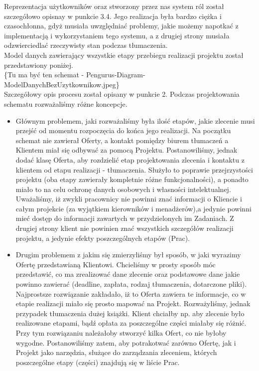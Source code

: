 \documentclass[licencjacka]{pracamgr}
\begin{document}
Reprezentacja użytkowników oraz stworzony przez nas system ról został szczegółowo opisnay w punkcie 3.4. 
Jego realizacja była bardzo ciężka i czasochłonna, gdyż musiała uwzględniać problemy, jakie możemy napotkać z implementacją i wykorzystaniem tego systemu, 
a z drugiej strony musiała odzwierciedlać rzeczywisty stan podczas tłumaczenia.\\

Model danych zawierający wszystkie etapy przebiegu realizacji projektu został przedstawiony poniżej.\\
\{Tu ma być ten schemat - Pengurus-Diagram-ModelDanychBezUzytkownikow.jpeg\} \\
Szczegółowy opis procesu został opisany w punkcie 2. Podczas projektowania schematu rozważaliśmy różne koncepcje.
\begin{itemize}
\item Głównym problemem, jaki rozważaliśmy była ilość etapów, jakie zlecenie musi przejść od momentu rozpoczęcia do końca jego realizacji. 
Na początku schemat nie zawierał Oferty, a kontakt pomiędzy biurem tłumaczeń a Klientem miał się odbywać za pomocą Projektu. 
Postanowiliśmy, jednak dodać klasę Oferta, aby rozdzielić etap projektowania zlecenia i kontaktu z klientem od etapu realizacji - tłumaczenia. 
Służyło to poprawie przejrzystości projektu (oba etapy zawierały kompletnie różne funkcjonalności), a ponadto miało to na celu ochronę danych osobowych i własności intelektualnej.
Uważaliśmy, iż zwykli pracownicy nie powinni znać informacji o Kliencie i całym projekcie (za wyjątkiem kierowników i menadżerów),a jedynie powinni mieć dostęp do informacji zawartych w przydzielonych im Zadaniach.
 Z drugiej strony klient nie powinien znać wszystkich szczegółów realizacji projektu, a jedynie efekty poszczególnych etapów (Prac).
\item Drugim problemem z jakim się zmierzyliśmy był sposób, w jaki wyrazimy Ofertę przedstawianą Klientowi.
Chcieliśmy w prosty sposób móc przedstawić, co ma zrealizować dane zlecenie oraz podstawowe dane jakie powinno zawierać (deadline, zapłata, rodzaj tłumaczenia, dotarczone pliki).
Najprostsze rozwiązanie zakładało, iż to Oferta zawiera te informacje, co w etapie realizacji miało się prosto mapować na Projekt.
Rozważyliśmy, jednak przypadek tłumaczenia dużej książki. Klient chciałby np. aby zlecenie było realizowane etapami, bądź opłata za poszczególne części miałaby się różnić.
Przy tym rozwiązaniu należałoby stworzyć kilka Ofert, co nie byłoby wygodne. 
Postanowiliśmy zatem, aby potrakotwać zarówno Ofertę, jak i Projekt jako narzędzia, służące do zarządzania zleceniem, których poszczególne etapy (części) znajdują się w liście Prac.

\end{itemize}
\end{document}
